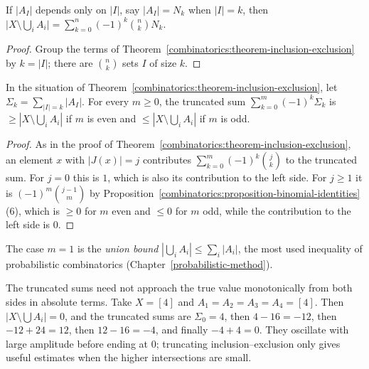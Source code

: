 \begin{corollary}\label{combinatorics:corollary-inclusion-exclusion-symmetric}
If $|A_I|$ depends only on $|I|$, say $|A_I| = N_k$ when $|I| = k$, then $\bigl|X \setminus \bigcup_iA_i\bigr| = \sum_{k=0}^{n}(-1)^k\binom{n}{k}N_k$.
\end{corollary}

\begin{proof}
Group the terms of Theorem~\ref{combinatorics:theorem-inclusion-exclusion} by $k = |I|$; there are $\binom{n}{k}$ sets $I$ of size $k$.
\end{proof}

\begin{proposition}\label{combinatorics:proposition-bonferroni}
In the situation of Theorem~\ref{combinatorics:theorem-inclusion-exclusion}, let $\Sigma_k = \sum_{|I| = k}|A_I|$. For every $m \geq 0$, the truncated sum
$\sum_{k=0}^{m}(-1)^k\Sigma_k$ is $\geq |X \setminus \bigcup_iA_i|$ if $m$ is even and $\leq |X \setminus \bigcup_iA_i|$ if $m$ is odd.
\end{proposition}

\begin{proof}
As in the proof of Theorem~\ref{combinatorics:theorem-inclusion-exclusion}, an element $x$ with $|J(x)| = j$ contributes $\sum_{k=0}^{m}(-1)^k\binom{j}{k}$ to the truncated sum. For $j = 0$ this is $1$,
which is also its contribution to the left side. For $j \geq 1$ it is $(-1)^m\binom{j - 1}{m}$ by Proposition~\ref{combinatorics:proposition-binomial-identities}(6), which is $\geq 0$ for $m$ even
and $\leq 0$ for $m$ odd, while the contribution to the left side is $0$.
\end{proof}

The case $m = 1$ is the \emph{union bound} $|\bigcup_iA_i| \leq \sum_i|A_i|$, the most used inequality of probabilistic combinatorics (Chapter~\ref{probabilistic-method}).

\begin{counterexample}\label{combinatorics:counterexample-bonferroni}
The truncated sums need not approach the true value monotonically from both sides in absolute terms. Take $X = [4]$ and $A_1 = A_2 = A_3 = A_4 = [4]$. Then $|X \setminus \bigcup A_i| = 0$, and the
truncated sums are $\Sigma_0 = 4$, then $4 - 16 = -12$, then $-12 + 24 = 12$, then $12 - 16 = -4$, and finally $-4 + 4 = 0$. They oscillate with large amplitude before ending at $0$; truncating
inclusion--exclusion only gives useful estimates when the higher intersections are small.
\end{counterexample}

